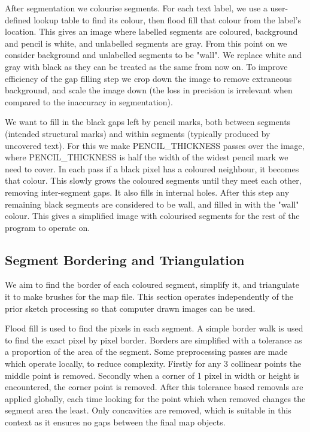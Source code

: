 \documentclass{IEEEtran}
\begin{document}
After segmentation we colourise segments. For each text label, we use a user-defined lookup table to find its colour, then flood fill that colour from the label's location. This gives an image where labelled segments are coloured, background and pencil is white, and unlabelled segments are gray. From this point on we consider background and unlabelled segments to be "wall". We replace white and gray with black as they can be treated as the same from now on. To improve efficiency of the gap filling step we crop down the image to remove extraneous background, and scale the image down (the loss in precision is irrelevant when compared to the inaccuracy in segmentation). 

We want to fill in the black gaps left by pencil marks, both between segments (intended structural marks) and within segments (typically produced by uncovered text). For this we make PENCIL\_THICKNESS passes over the image, where PENCIL\_THICKNESS is half the width of the widest pencil mark we need to cover. In each pass if a black pixel has a coloured neighbour, it becomes that colour. This slowly grows the coloured segments until they meet each other, removing inter-segment gaps. It also fills in internal holes. After this step any remaining black segments are considered to be wall, and filled in with the "wall" colour. This gives a simplified image with colourised segments for the rest of the program to operate on.

\subsection{Segment Bordering and Triangulation}

We aim to find the border of each coloured segment, simplify it, and triangulate it to make brushes for the map file. This section operates independently of the prior sketch processing so that computer drawn images can be used.

Flood fill is used to find the pixels in each segment. A simple border walk is used to find the exact pixel by pixel border. Borders are simplified with a tolerance as a proportion of the area of the segment. Some preprocessing passes are made which operate locally, to reduce complexity. Firstly for any 3 collinear points the middle point is removed. Secondly when a corner of 1 pixel in width or height is encountered, the corner point is removed. After this tolerance based removals are applied globally, each time looking for the point which when removed changes the segment area the least. Only concavities are removed, which is suitable in this context as it ensures no gaps between the final map objects.



\end{document}
